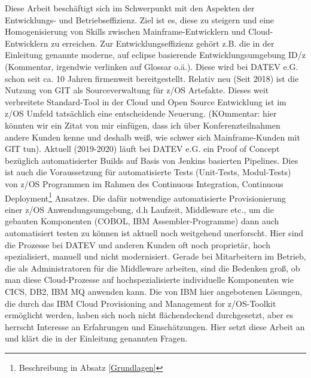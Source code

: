 Diese Arbeit beschäftigt sich im Schwerpunkt mit den Aspekten der Entwicklungs- und Betriebseffizienz. 
Ziel ist es, diese zu steigern und eine Homogenisierung von Skills zwischen Mainframe-Entwicklern und Cloud-Entwicklern zu erreichen. 
Zur Entwicklungseffizienz gehört z.B. die in der Einleitung genannte moderne, auf eclipse basierende Entwicklungsumgebung ID/z (Kommentar, irgendwie verlinken auf Glossar o.ä.).
Diese wird bei DATEV e.G. schon seit ca. 10 Jahren firmenweit bereitgestellt.
Relativ neu (Seit 2018) ist die Nutzung von GIT als Sourceverwaltung für z/OS Artefakte. 
Dieses weit verbreitete Standard-Tool in der Cloud und Open Source Entwicklung ist im z/OS Umfeld tatsächlich eine entscheidende Neuerung. (KOmmentar: hier könnten wir ein Zitat von mir einfügen, dass ich über Konferenzteilnahmen andere Kunden kenne und deshalb weiß, wie schwer sich Mainframe-Kunden mit GIT tun). 
Aktuell (2019-2020) läuft bei DATEV e.G. ein Proof of Concept bezüglich automatisierter Builds auf Basis von Jenkins basierten Pipelines.
Dies ist auch die Voraussetzung für automatisierte Tests (Unit-Tests, Modul-Tests) von z/OS Programmen im Rahmen des \glqq Continuous Integration, Continuous Deployment\grqq{}\footnote{Beschreibung in Absatz \ref{Grundlagen}} Ansatzes.
Die dafür notwendige automatisierte Provisionierung einer z/OS Anwendungsumgebung, d.h Laufzeit, Middleware etc., um die gebauten Komponenten (COBOL, IBM Assembler-Programme) dann auch automatisiert testen zu können ist aktuell noch weitgehend unerforscht. 
Hier sind die Prozesse bei DATEV und anderen Kunden oft noch proprietär, hoch spezialisiert,  manuell und  nicht modernisiert. 
Gerade bei Mitarbeitern im Betrieb, die als Administratoren für die Middleware arbeiten, sind die Bedenken groß, ob man diese Cloud-Prozesse auf hochspezialisierte individuelle Komponenten wie CICS, DB2, IBM MQ anwenden kann.
Die von IBM hier angebotenen Lösungen, die durch das \glqq IBM Cloud Provisioning and Management for z/OS\grqq-Toolkit ermöglicht werden, haben sich noch nicht flächendeckend durchgesetzt, aber es herrscht Interesse an Erfahrungen und Einschätzungen.
Hier setzt diese Arbeit an und klärt die in der Einleitung genannten Fragen.


